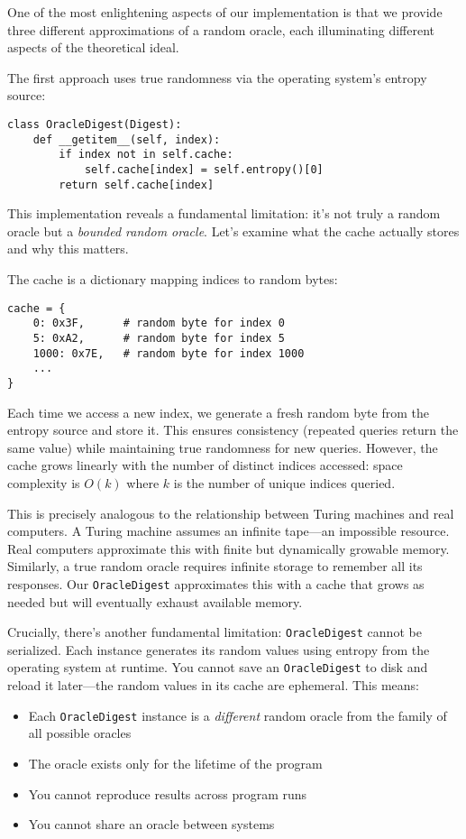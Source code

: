 \documentclass[11pt]{article}
\begin{document}
One of the most enlightening aspects of our implementation is that we provide three different approximations of a random oracle, each illuminating different aspects of the theoretical ideal.

The first approach uses true randomness via the operating system's entropy source:

\begin{lstlisting}
class OracleDigest(Digest):
    def __getitem__(self, index):
        if index not in self.cache:
            self.cache[index] = self.entropy()[0]
        return self.cache[index]
\end{lstlisting}

This implementation reveals a fundamental limitation: it's not truly a random oracle but a \emph{bounded random oracle}. Let's examine what the cache actually stores and why this matters.

The cache is a dictionary mapping indices to random bytes:
\begin{verbatim}
cache = {
    0: 0x3F,      # random byte for index 0
    5: 0xA2,      # random byte for index 5
    1000: 0x7E,   # random byte for index 1000
    ...
}
\end{verbatim}

Each time we access a new index, we generate a fresh random byte from the entropy source and store it. This ensures consistency (repeated queries return the same value) while maintaining true randomness for new queries. However, the cache grows linearly with the number of distinct indices accessed: space complexity is $O(k)$ where $k$ is the number of unique indices queried.

This is precisely analogous to the relationship between Turing machines and real computers. A Turing machine assumes an infinite tape---an impossible resource. Real computers approximate this with finite but dynamically growable memory. Similarly, a true random oracle requires infinite storage to remember all its responses. Our \texttt{OracleDigest} approximates this with a cache that grows as needed but will eventually exhaust available memory.

Crucially, there's another fundamental limitation: \texttt{OracleDigest} cannot be serialized. Each instance generates its random values using entropy from the operating system at runtime. You cannot save an \texttt{OracleDigest} to disk and reload it later---the random values in its cache are ephemeral. This means:
\begin{itemize}
\item Each \texttt{OracleDigest} instance is a \emph{different} random oracle from the family of all possible oracles
\item The oracle exists only for the lifetime of the program
\item You cannot reproduce results across program runs
\item You cannot share an oracle between systems
\end{itemize}
\end{document}
